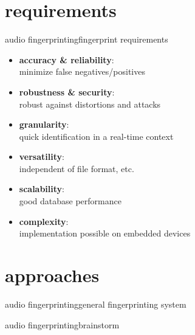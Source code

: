     \section[requirements]{requirements}
        \begin{frame}{audio fingerprinting}{fingerprint requirements}
            \begin{itemize}%
                \item	\textbf{accuracy \& reliability}:\\ minimize false negatives/positives
                \item<2->	\textbf{robustness \& security}: \\ robust against distortions and attacks
                \item<3->	\textbf{granularity}:\\ quick identification in a real-time context
                \item<4->	\textbf{versatility}:\\ independent of file format, etc.
                \item<5->	\textbf{scalability}:\\ good database performance
                \item<6->	\textbf{complexity}:\\ implementation possible on embedded devices
            \end{itemize}
        \end{frame}
        
    \section[approaches]{approaches}
        \begin{frame}{audio fingerprinting}{general fingerprinting system}
            \begin{figure}
                \centering
                	
            \end{figure}
        \end{frame}
        \begin{frame}{audio fingerprinting}{brainstorm}
        \end{frame}
        
